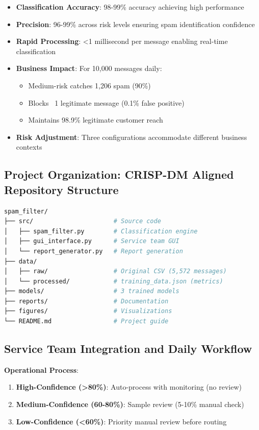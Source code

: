 \documentclass[12pt,a4paper]{article}
\begin{document}
\begin{itemize}
    \item \textbf{Classification Accuracy}: 98-99\% accuracy achieving high performance
    \item \textbf{Precision}: 96-99\% across risk levels ensuring spam identification confidence
    \item \textbf{Rapid Processing}: <1 millisecond per message enabling real-time classification
    \item \textbf{Business Impact}: For 10,000 messages daily:
    \begin{itemize}
        \item Medium-risk catches 1,206 spam (90\%)
        \item Blocks ~1 legitimate message (0.1\% false positive)
        \item Maintains 98.9\% legitimate customer reach
    \end{itemize}
    \item \textbf{Risk Adjustment}: Three configurations accommodate different business contexts
\end{itemize}

\subsection{Project Organization: CRISP-DM Aligned Repository Structure}

\begin{lstlisting}[language=bash, basicstyle=\ttfamily\small]
spam_filter/
├── src/                      # Source code
│   ├── spam_filter.py        # Classification engine
│   ├── gui_interface.py      # Service team GUI
│   └── report_generator.py   # Report generation
├── data/
│   ├── raw/                  # Original CSV (5,572 messages)
│   └── processed/            # training_data.json (metrics)
├── models/                   # 3 trained models
├── reports/                  # Documentation
├── figures/                  # Visualizations
└── README.md                 # Project guide
\end{lstlisting}

\subsection{Service Team Integration and Daily Workflow}

\textbf{Operational Process}:
\begin{enumerate}
    \item \textbf{High-Confidence (>80\%)}: Auto-process with monitoring (no review)
    \item \textbf{Medium-Confidence (60-80\%)}: Sample review (5-10\% manual check)
    \item \textbf{Low-Confidence (<60\%)}: Priority manual review before routing
\end{enumerate}
\end{document}
